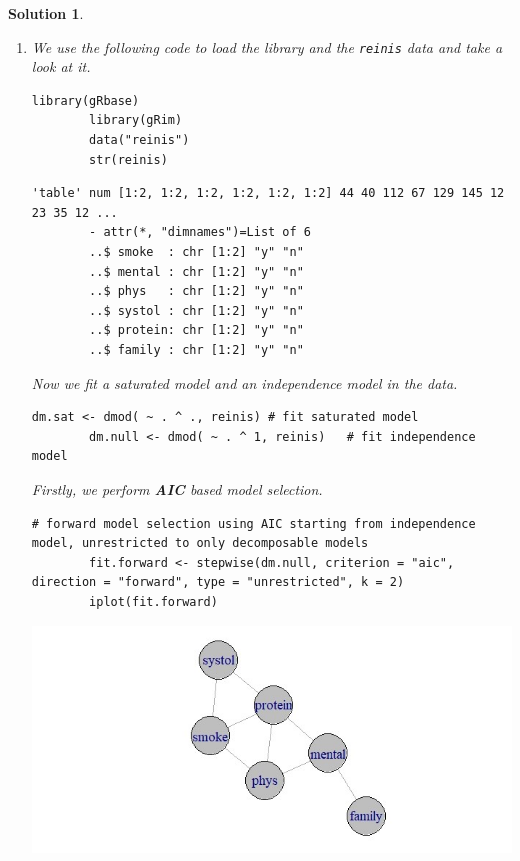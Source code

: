 \documentclass[12pt]{article}
\theoremstyle{problemstyle}
\newtheorem*{solution*}{Solution}
\begin{document}
\begin{solution*}

\begin{enumerate}
	\item[(i)] 
	We use the following code to load the library and the \texttt{reinis} data and take a look at it.
	
	\begin{lstlisting}[style = R-code]
		library(gRbase)
		library(gRim)
		data("reinis")
		str(reinis)
	\end{lstlisting}
	\begin{lstlisting}[style = R-output]
		'table' num [1:2, 1:2, 1:2, 1:2, 1:2, 1:2] 44 40 112 67 129 145 12 23 35 12 ...
		- attr(*, "dimnames")=List of 6
		..$ smoke  : chr [1:2] "y" "n"
		..$ mental : chr [1:2] "y" "n"
		..$ phys   : chr [1:2] "y" "n"
		..$ systol : chr [1:2] "y" "n"
		..$ protein: chr [1:2] "y" "n"
		..$ family : chr [1:2] "y" "n"
	\end{lstlisting}
	
	Now we fit a saturated model and an independence model in the data.
	\begin{lstlisting}[style = R-code]
		dm.sat <- dmod( ~ . ^ ., reinis) # fit saturated model
		dm.null <- dmod( ~ . ^ 1, reinis)   # fit independence model
	\end{lstlisting}
	
	Firstly, we perform \textbf{AIC} based model selection.
	\begin{lstlisting}[style = R-code]
		# forward model selection using AIC starting from independence model, unrestricted to only decomposable models
		fit.forward <- stepwise(dm.null, criterion = "aic", direction = "forward", type = "unrestricted", k = 2)
		iplot(fit.forward)
	\end{lstlisting}
	
	\includegraphics[width=\linewidth]{reinis-aic-forward.jpeg}
	

\end{enumerate}
\end{solution*}
\end{document}
